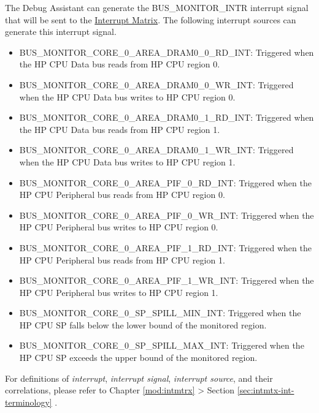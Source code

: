 \documentclass[main\_\_EN.tex]{subfiles}
\begin{document}
The Debug Assistant can generate the BUS\_MONITOR\_INTR interrupt signal that will be sent to the \hyperref[mod:intmtrx]{Interrupt Matrix}. The following interrupt sources can generate this interrupt signal.

\begin{itemize}
    \item \label{int:BUSMONITORCORE0AREADRAM00RDINT}BUS\_MONITOR\_CORE\_0\_AREA\_DRAM0\_0\_RD\_INT: Triggered when the HP CPU Data bus reads from HP CPU region 0.
    \item \label{int:BUSMONITORCORE0AREADRAM00WRINT}BUS\_MONITOR\_CORE\_0\_AREA\_DRAM0\_0\_WR\_INT: Triggered when the HP CPU Data bus writes to HP CPU region 0.
    \item \label{int:BUSMONITORCORE0AREADRAM01RDINT}BUS\_MONITOR\_CORE\_0\_AREA\_DRAM0\_1\_RD\_INT: Triggered when the HP CPU Data bus reads from HP CPU region 1.
    \item \label{int:BUSMONITORCORE0AREADRAM01WRINT}BUS\_MONITOR\_CORE\_0\_AREA\_DRAM0\_1\_WR\_INT: Triggered when the HP CPU Data bus writes to HP CPU region 1.
    \item \label{int:BUSMONITORCORE0AREAPIF0RDINT}BUS\_MONITOR\_CORE\_0\_AREA\_PIF\_0\_RD\_INT: Triggered when the HP CPU Peripheral bus reads from HP CPU region 0.
    \item \label{int:BUSMONITORCORE0AREAPIF0WRINT}BUS\_MONITOR\_CORE\_0\_AREA\_PIF\_0\_WR\_INT: Triggered when the HP CPU Peripheral bus writes to HP CPU region 0.
    \item \label{int:BUSMONITORCORE0AREAPIF1RDINT}BUS\_MONITOR\_CORE\_0\_AREA\_PIF\_1\_RD\_INT: Triggered when the HP CPU Peripheral bus reads from HP CPU region 1.
    \item \label{int:BUSMONITORCORE0AREAPIF1WRINT}BUS\_MONITOR\_CORE\_0\_AREA\_PIF\_1\_WR\_INT: Triggered when the HP CPU Peripheral bus writes to HP CPU region 1.
    \item \label{int:BUSMONITORCORE0SPSPILLMININT}BUS\_MONITOR\_CORE\_0\_SP\_SPILL\_MIN\_INT: Triggered when the HP CPU SP falls below the lower bound of the monitored region.
    \item \label{int:BUSMONITORCORE0SPSPILLMAXINT}BUS\_MONITOR\_CORE\_0\_SP\_SPILL\_MAX\_INT: Triggered when the HP CPU SP exceeds the upper bound of the monitored region.
\end{itemize}

\begin{tiplisting}
For definitions of \textit{interrupt}, \textit{interrupt signal}, \textit{interrupt source}, and their correlations, please refer to Chapter \ref{mod:intmtrx} \textit{} > Section \ref{sec:intmtx-int-terminology} \textit{}.
\end{tiplisting}
\end{document}
